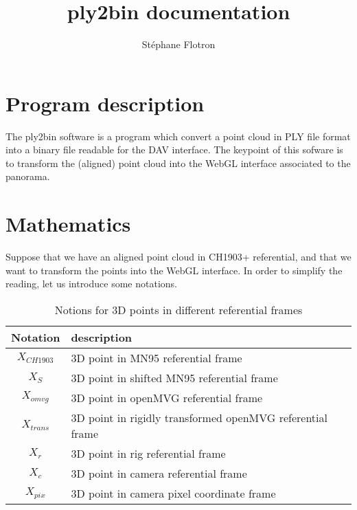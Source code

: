 \documentclass[a4paper, 11pt]{article}
\author{ St\'ephane Flotron }
\title{\textbf{ply2bin documentation}}
\begin{document}
   \maketitle
   
   \section*{Program description}
   
   The ply2bin software is a program which convert a point cloud in PLY file format into 
   a binary file readable for the DAV interface. 
   The keypoint of this sofware is to transform the (aligned) point cloud into the WebGL
   interface associated to the panorama.
   
   \section*{Mathematics}
   
   Suppose that we have an aligned point cloud in CH1903+ referential, and that we want to transform the points into
   the WebGL interface. In order to simplify the reading, let us introduce some notations. 
   
   \begin{table}[H]
      \begin{center}
        \begin{tabular}{|c|l|}
                \hline 
                    Notation & description \\
                \hline
                    $X_{CH1903}$ & 3D point in MN95 referential frame \\
                    $X_S$       & 3D point in shifted MN95 referential frame \\
                    $X_{omvg}$   & 3D point in openMVG referential frame \\
                    $X_{trans}$ & 3D point in rigidly transformed openMVG referential frame \\
                    $X_r$       & 3D point in rig referential frame \\
                    $X_c$       & 3D point in camera referential frame \\
                    $X_{pix}$   & 3D point in camera pixel coordinate frame \\
                \hline
        \end{tabular}
      \end{center}
      \label{3D point notation}
      \caption{Notions for 3D points in different referential frames}
   \end{table}
   
\end{document}
